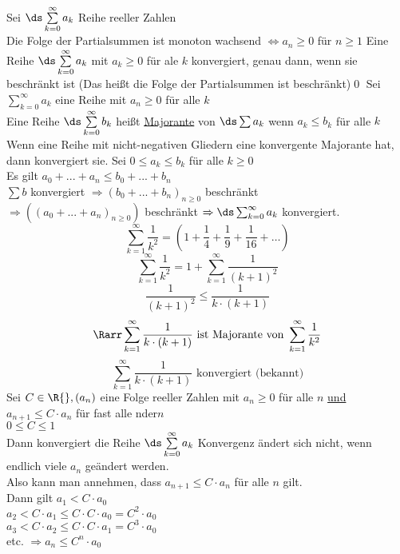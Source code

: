 \bem
Sei $\ds\sum\limits_{k=0}^{\infty} a_k$ Reihe reeller Zahlen\\
Die Folge der Partialsummen ist monoton wachsend $\Leftrightarrow a_n \geq 0$ für $n \geq 1$
\Satz
Eine Reihe $\ds\sum\limits_{k=0}^{\infty} a_k$ mit $a_k \geq 0$ für ale $k$ konvergiert, genau dann, wenn sie beschränkt ist (Das heißt die Folge der Partialsummen ist beschränkt)\qed
\Def
Sei $\displaystyle\sum\limits_{k=0}^{\infty} a_k$ eine Reihe mit $a_n \geq 0$ für alle $k$\\
Eine Reihe $\ds\sum\limits_{k=0}^{\infty} b_k$ heißt \underline{Majorante} von $\ds\sum a_k$ wenn $a_k \leq b_k$ für alle $k$
Wenn eine Reihe mit nicht-negativen Gliedern eine konvergente Majorante hat, dann konvergiert sie.
\bew
Sei $0 \leq a_k \leq b_k$ für alle $k \geq 0$\\
Es gilt $a_0 + ... + a_n \leq b_0 + ... + b_n$ \\
$\sum b$ konvergiert $\Rightarrow (b_0 + ... + b_n)_{n \geq 0}$  beschränkt\\
$\Rightarrow ((a_0 + ... + a_n)_{n \geq 0})$ beschränkt $\Rightarrow \ds\sum_{k= 0}^{\infty} a_k$ konvergiert.
$$\sum\limits_{k=1}^{\infty} \frac{1}{k^2} = \left( 1 + \frac{1}{4} + \frac{1}{9}+ \frac{1}{16} + … \right)$$
$$\sum\limits_{k=1}^{\infty} \frac{1}{k^2} = 1 + \sum\limits_{k=1}^{\infty} \frac{1}{(k + 1)^2}$$
$$\frac{1}{(k + 1)^2} \leq \frac{1}{k \cdot (k + 1)}$$
$$\Rarr \sum\limits_{k=1}^{\infty} \frac{1}{k \cdot (k + 1)}\text{ ist Majorante von }\sum\limits_{k=1}^{\infty} \frac{1}{k^2}$$
$$\sum\limits_{k=1}^{\infty} \frac{1}{k \cdot (k + 1)}\text{ konvergiert (bekannt)}$$
Sei $C \in \R{}, (a_n)$ eine Folge reeller Zahlen mit $a_n \geq 0$ für alle $n$ \ul{und} $a_{n + 1} \leq C \cdot a_n$ für fast alle nder$n$\\
$0 \leq C \leq 1$\\
Dann konvergiert die Reihe $\ds\sum\limits_{k=0}^{\infty} a_k$
\bew
Konvergenz ändert sich nicht, wenn endlich viele $a_n$ geändert werden.\\
Also kann man annehmen, dass $a_{n + 1} \leq C \cdot a_n$ für alle $n$ gilt.\\
Dann gilt $a_1 < C \cdot a_0$\\
$a_2 < C \cdot a_1 \leq C \cdot C \cdot a_0 = C^2 \cdot a_0$\\
$a_3 < C \cdot a_2 \leq C \cdot C \cdot a_1 = C^3 \cdot a_0$\\
etc. $\Rightarrow a_n \leq C^n \cdot a_0$\\
